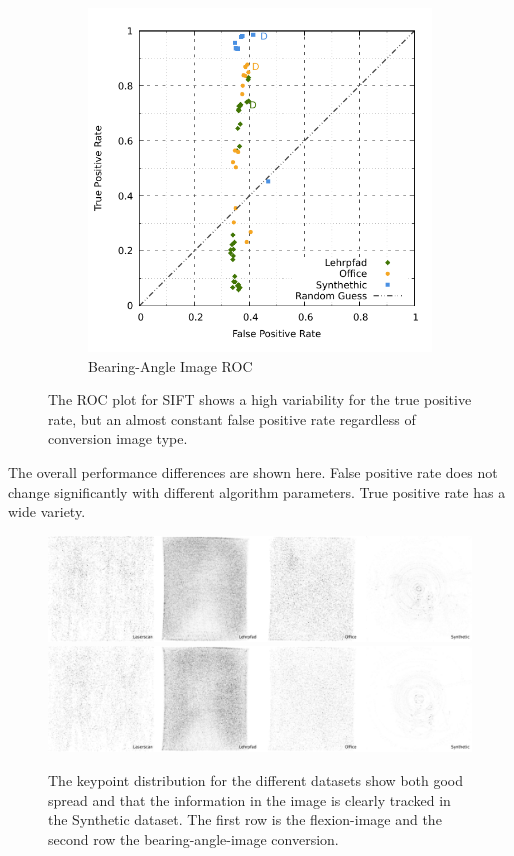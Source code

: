 \begin{figure}[H]
\begin{subfigure}[t]{0.45\linewidth}
    \includegraphics[width=\linewidth]{chapter06/results/SIFT/bearing/roc.pdf}
    \caption{Bearing-Angle Image ROC}
\end{subfigure}
    \caption{The ROC plot for SIFT shows a high variability for the true positive rate, but an almost constant false positive rate regardless of conversion image type.}
\end{figure}
The overall performance differences are shown here.
False positive rate does not change significantly with different algorithm parameters.
True positive rate has a wide variety.
\begin{figure}[H]
    \includegraphics[width=\linewidth]{chapter06/results/SIFT/flexion/distribution.pdf}\\
    \includegraphics[width=\linewidth]{chapter06/results/SIFT/bearing/distribution.pdf}%
    \caption{The keypoint distribution for the different datasets show both good spread and that the information in the image is clearly tracked in the Synthetic dataset. The first row is the \gls{flexion-image} and the second row the \gls{bearing-angle-image} conversion.}
\end{figure}
